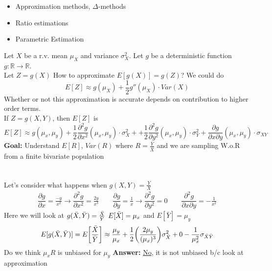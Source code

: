 \begin{itemize}
	\item Approximation methods, $\Delta$-methods
	\item Ratio estimations
	\item Parametric Estimation
\end{itemize}
Let $X$ be a r.v. mean $\mu_X$ and variance $\sigma_X^2$. Let $g$ be a deterministic function $g: \mathbb{R} \rightarrow \mathbb{R}$. \\
Let $Z = g(X)$ \qquad How to approximate $E[g(X)] = g(Z)$? We could do
\begin{equation*}
	E[Z] \approx g(\mu_X) + \frac{1}{2} g''(\mu_X) \cdot Var(X)
\end{equation*}
Whether or not this approximation is accurate depends on contribution to higher order terms. \\
If $Z = g(X,Y)$, then $E[Z]$ is 
\begin{equation*}
	E[Z] \approx g(\mu_x, \mu_y) + \frac{1}{2} \dfrac{\partial^2 g}{\partial x^2}(\mu_x, \mu_y) \cdot \sigma_X^2 + + \frac{1}{2} \dfrac{\partial^2 g}{\partial y^2}(\mu_x, \mu_y) \cdot \sigma_Y^2 + \dfrac{\partial g}{\partial x \partial y}(\mu_x, \mu_y) \cdot \sigma_{XY}
\end{equation*}
\textbf{Goal:} Understand $E[R]$, $Var(R)$ where $R = \frac{\bar{Y}}{\bar{X}}$ and we are sampling W.o.R from a finite bivariate population\\
\redhline\\\\
Let's consider what happens when $g(X,Y) = \frac{Y}{X}$
\begin{gather*}
	\dfrac{\partial g}{\partial x} = \frac{-y}{x^2} \rightarrow \dfrac{\partial^2 g}{\partial x^2} = \frac{2y}{x^3} \qquad 
	\dfrac{\partial g}{\partial y} = \frac{1}{x} \rightarrow \dfrac{\partial^2 g}{\partial y^2} = 0 \qquad \dfrac{\partial^2 g}{\partial x \partial y} = -\frac{1}{x^2}
\end{gather*}
Here we will look at $g(\bar{X},\bar{Y}) = \frac{\bar{X}}{\bar{Y}}$ \qquad $E[\bar{X}] = \mu_x$ and $E[\bar{Y}] = \mu_y$
\begin{gather*}
	E[g(\bar{X},\bar{Y})] = E\bigg[\frac{\bar{X}}{\bar{Y}}\bigg] \approx \frac{\mu_y}{\mu_x} + \frac{1}{2}\bigg(\frac{2 \mu_y}{(\mu_x)^3} \bigg) \sigma_{\bar{X}}^2 + 0 - \frac{1}{\mu_x^2} \sigma_{\bar{X} \bar{Y}}
\end{gather*}
Do we think $\mu_x R$ is unbiased for $\mu_y$ \quad \textbf{Answer: } \underline{No}, it is not unbiased b/c look at approximation
